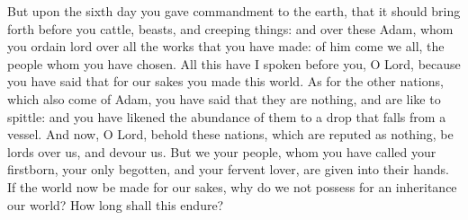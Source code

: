 {But upon the sixth day you gave commandment to the earth, that it should bring forth before you cattle, beasts, and creeping things:
and over these Adam, whom you ordain lord over all the works that you have made: of him come we all, the people whom you have chosen.
All this have I spoken before you, O Lord, because you have said that for our sakes you made
 this world.
As for the other nations, which also come of Adam, you have said that they are nothing, and are like to spittle: and you have likened the abundance of them to a drop that falls from a vessel.
And now, O Lord, behold these nations, which are reputed as nothing, be lords over us, and devour us.
But we your people, whom you have called your firstborn, your only begotten, and your fervent lover, are given into their hands.
If the world now be made for our sakes, why do we not possess for an inheritance our world? How long shall this endure?

}
